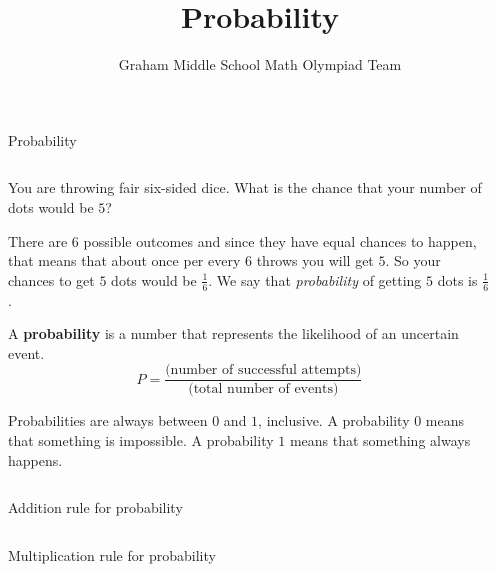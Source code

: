 \documentclass[9pt,aspectratio=169]{beamer}
\title{Probability}
\subtitle[Graham Middle School]{Graham Middle School Math Olympiad Team}
\begin{document}
\maketitle

\begin{frame}{Probability}
  \begin{columns}[T]
    \begin{column}{0.5\textwidth}
      \begin{problem}
        You are throwing fair six-sided dice. What is the chance that your number of dots would be $5$?
      \end{problem}

      There are $6$ possible outcomes and since they have equal chances to happen, that means that about once per every $6$ throws you will get $5$. So your chances to get $5$ dots would be $\frac{1}{6}$. We say that \emph{probability} of getting $5$ dots is $\frac{1}{6}$.

      \begin{definition}
        A \textbf{probability} is a number that represents the likelihood of an uncertain event. 
        \[ P = \frac{\text{(number of successful attempts)}}{\text{(total number of events)}} \]
        \vspace*{-1ex}
      \end{definition}
      Probabilities are always between $0$ and $1$, inclusive. A probability $0$ means that something is impossible. A probability $1$ means that something always happens.
    \end{column}
    \begin{column}{0.5\textwidth}

    \end{column}
  \end{columns}
\end{frame}

\begin{frame}{Addition rule for probability}
  \begin{columns}[T]
    \begin{column}{0.5\textwidth}
    \end{column}
    \begin{column}{0.5\textwidth}
    \end{column}
  \end{columns}
\end{frame}

\begin{frame}{Multiplication rule for probability}
  \begin{columns}[T]
    \begin{column}{0.5\textwidth}
    \end{column}
    \begin{column}{0.5\textwidth}
    \end{column}
  \end{columns}
\end{frame}
\end{document}
